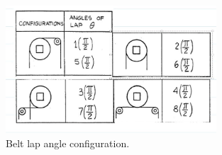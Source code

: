 \begin{figure}[h!]
\centering
\includegraphics[width=0.7\textwidth]{chapters/lab2/angle}
\caption{Belt lap angle configuration.}
\label{fig:mesh2}
\end{figure}